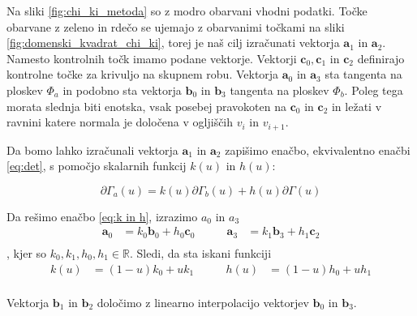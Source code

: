 \documentclass[a4paper,regno]{article}
\newcommand{\tbf}{\textbf}
\begin{document}
	Na sliki \ref{fig:chi_ki_metoda} so z modro obarvani vhodni podatki.
	Točke obarvane z zeleno in rdečo se ujemajo z obarvanimi točkami na sliki 
	\ref{fig:domenski_kvadrat_chi_ki}, torej je naš cilj izračunati vektorja $\textbf{a}_1$ in 
	$\textbf{a}_2$.  Namesto kontrolnih točk imamo podane vektorje. Vektorji $\textbf{c}_0, \textbf{c}_1$ in $\textbf{c}_2$
	definirajo kontrolne točke za krivuljo na skupnem robu. Vektorja $\textbf{a}_0$ in $\textbf{a}_3$ 
	sta tangenta na ploskev $\Phi_a$ in podobno sta vektorja $\textbf{b}_0$ in $\textbf{b}_3$ tangenta 
	na ploskev $\Phi_b$. Poleg tega morata slednja biti enotska,
	vsak posebej pravokoten na $\textbf{c}_0$ in $\textbf{c}_2$ in ležati v ravnini katere normala je določena
	v ogljiščih $v_i$ in $v_{i + 1}$.

	Da bomo lahko izračunali vektorja $\textbf{a}_1$ in $\textbf{a}_2$ zapišimo enačbo, ekvivalentno
	enačbi \ref{eq:det}, s pomočjo skalarnih funkcij $k(u)$ in $h(u)$:

	\begin{equation}
		\label{eq:k in h}
		\partial \Gamma_a(u) = k(u) \partial \Gamma_b(u) + h(u) \partial \Gamma(u)
	\end{equation}
	
	Da rešimo enačbo \ref{eq:k in h}, izrazimo $a_0$ in $a_3$
	\begin{equation*}
		\begin{split}
			\tbf{a}_0 &= k_0\tbf{b}_0 + h_0\tbf{c}_0 \\
		\end{split}
		\quad\quad
		\begin{split}
			\tbf{a}_3 &= k_1\tbf{b}_3 + h_1\tbf{c}_2 \\
		\end{split}
	\end{equation*},
	kjer so $k_0, k_1, h_0, h_1 \in \mathbb{R}$. Sledi, da sta iskani funkciji
	\begin{equation*}
		\begin{split}
			k(u) &= (1 - u) k_0 + u k_1 \\
		\end{split}
		\quad\quad
		\begin{split}
			h(u) &= (1 - u) h_0 + u h_1 \\
		\end{split}
	\end{equation*}

	Vektorja $\textbf{b}_1$ in $\textbf{b}_2$ določimo z linearno interpolacijo 
	vektorjev $\textbf{b}_0$ in $\textbf{b}_3$.
\end{document}
